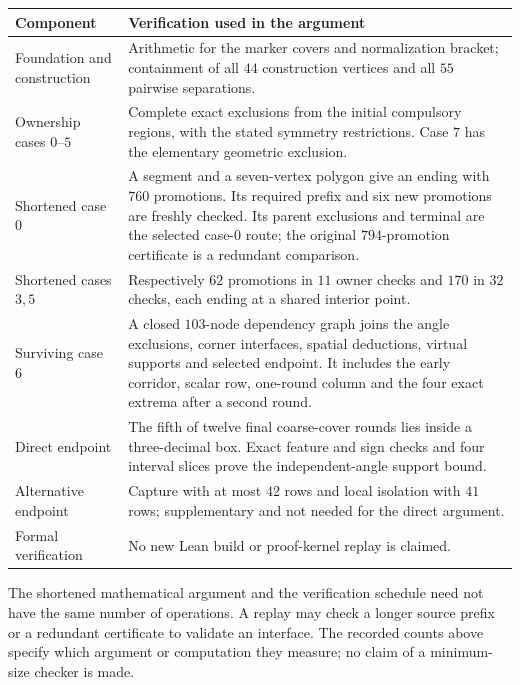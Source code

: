 \documentclass[11pt]{article}
\begin{document}
\begin{center}\small
\begin{tabular}{@{}p{}p{}@{}}
\toprule
Component & Verification used in the argument\\\midrule
Foundation and construction & Arithmetic for the marker covers and
normalization bracket; containment of all $44$ construction vertices and
all $55$ pairwise separations.\\
Ownership cases $0$--$5$ & Complete exact exclusions from the initial
compulsory regions, with the stated symmetry restrictions. Case $7$ has
the elementary geometric exclusion.\\
Shortened case $0$ & A segment and a seven-vertex polygon give an ending
with $760$ promotions. Its required prefix and six new promotions are
freshly checked. Its parent exclusions and terminal are the selected case-$0$ route;
the original $794$-promotion certificate is a redundant comparison.\\
Shortened cases $3,5$ & Respectively $62$ promotions in $11$ owner checks
and $170$ in $32$ checks, each ending at a shared interior point.\\
Surviving case $6$ & A closed $103$-node dependency graph joins the angle
exclusions, corner interfaces, spatial deductions, virtual supports and
selected endpoint. It includes the early corridor, scalar row, one-round
column and the four exact extrema after a second round.\\
Direct endpoint & The fifth of twelve final coarse-cover rounds lies
inside a three-decimal box. Exact feature and sign checks and four
interval slices prove the independent-angle support bound.\\
Alternative endpoint & Capture with at most $42$ rows and local isolation
with $41$ rows; supplementary and not needed for the direct argument.\\
Formal verification & No new Lean build or proof-kernel replay is claimed.\\
\bottomrule
\end{tabular}
\end{center}

The shortened mathematical argument and the verification schedule need
not have the same number of operations. A replay may check a longer
source prefix or a redundant certificate to validate an interface.
The recorded counts above specify which argument or computation they
measure; no claim of a minimum-size checker is made.
\end{document}

